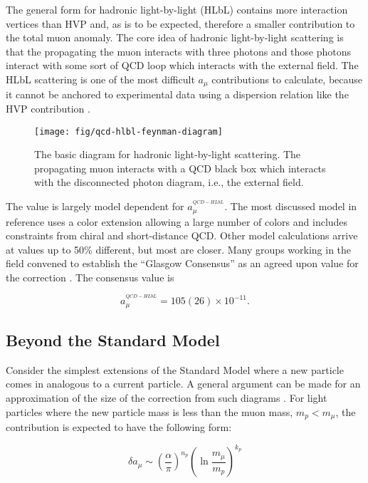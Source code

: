 The general form for hadronic light-by-light (HLbL) contains more interaction vertices than HVP and, as is to be expected, therefore a smaller contribution to the total muon anomaly.  The core idea of hadronic light-by-light scattering is that the propagating the muon interacts with three photons and those photons interact with some sort of QCD loop which interacts with the external field.  The HLbL scattering is one of the most difficult $a_\mu$ contributions to calculate, because it cannot be anchored to experimental data using a dispersion relation like the HVP contribution \cite{the-muon-g-2}.

\begin{figure}
\centering
\texttt{[image: fig/qcd-hlbl-feynman-diagram]}
\caption{The basic diagram for hadronic light-by-light scattering.  The propagating muon interacts with a QCD black box which interacts with the disconnected photon diagram, i.e., the external field. \label{fig:qcd-hlbl-feynman-diagram}}
\end{figure}

The value is largely model dependent for $a_\mu^{^{QCD-HLbL}}$.  The most discussed model in reference \cite{amm-of-muon} uses a color extension allowing a large number of colors and includes constraints from chiral and short-distance QCD.  Other model calculations arrive at values up to 50\% different, but most are closer.  Many groups working in the field convened to establish the ``Glasgow Consensus'' as an agreed upon value for the correction \cite{e989-tdr}.  The consensus value is

\begin{equation}
\label{eqn:qcd-hlbl-total}
a_\mu^{^{QCD-HLbL}} = 105(26) \times 10^{-11}.
\end{equation}

\subsection{Beyond the Standard Model}

Consider the simplest extensions of the Standard Model where a new particle comes in analogous to a current particle.  A general argument can be made for an approximation of the size of the correction from such diagrams \cite{the-muon-g-2}.  For light particles where the new particle mass is less than the muon mass, $m_p < m_\mu$, the contribution is expected to have the following form:

\begin{equation}
\label{eqn:bsm-general-small-m}
\delta a_\mu \sim \left(\frac{\alpha}{\pi}\right)^{n_p} \left( \ln{\frac{m_\mu}{m_p}} \right)^{k_p}
\end{equation}

